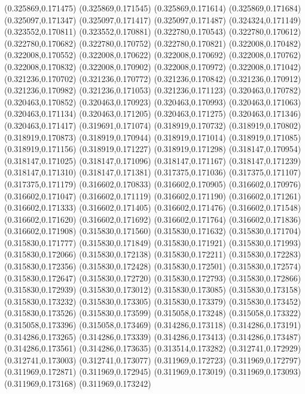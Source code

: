 (0.325869,0.171475)
(0.325869,0.171545)
(0.325869,0.171614)
(0.325869,0.171684)
(0.325097,0.171347)
(0.325097,0.171417)
(0.325097,0.171487)
(0.324324,0.171149)
(0.323552,0.170811)
(0.323552,0.170881)
(0.322780,0.170543)
(0.322780,0.170612)
(0.322780,0.170682)
(0.322780,0.170752)
(0.322780,0.170821)
(0.322008,0.170482)
(0.322008,0.170552)
(0.322008,0.170622)
(0.322008,0.170692)
(0.322008,0.170762)
(0.322008,0.170832)
(0.322008,0.170902)
(0.322008,0.170972)
(0.322008,0.171042)
(0.321236,0.170702)
(0.321236,0.170772)
(0.321236,0.170842)
(0.321236,0.170912)
(0.321236,0.170982)
(0.321236,0.171053)
(0.321236,0.171123)
(0.320463,0.170782)
(0.320463,0.170852)
(0.320463,0.170923)
(0.320463,0.170993)
(0.320463,0.171063)
(0.320463,0.171134)
(0.320463,0.171205)
(0.320463,0.171275)
(0.320463,0.171346)
(0.320463,0.171417)
(0.319691,0.171074)
(0.318919,0.170732)
(0.318919,0.170802)
(0.318919,0.170873)
(0.318919,0.170944)
(0.318919,0.171014)
(0.318919,0.171085)
(0.318919,0.171156)
(0.318919,0.171227)
(0.318919,0.171298)
(0.318147,0.170954)
(0.318147,0.171025)
(0.318147,0.171096)
(0.318147,0.171167)
(0.318147,0.171239)
(0.318147,0.171310)
(0.318147,0.171381)
(0.317375,0.171036)
(0.317375,0.171107)
(0.317375,0.171179)
(0.316602,0.170833)
(0.316602,0.170905)
(0.316602,0.170976)
(0.316602,0.171047)
(0.316602,0.171119)
(0.316602,0.171190)
(0.316602,0.171261)
(0.316602,0.171333)
(0.316602,0.171405)
(0.316602,0.171476)
(0.316602,0.171548)
(0.316602,0.171620)
(0.316602,0.171692)
(0.316602,0.171764)
(0.316602,0.171836)
(0.316602,0.171908)
(0.315830,0.171560)
(0.315830,0.171632)
(0.315830,0.171704)
(0.315830,0.171777)
(0.315830,0.171849)
(0.315830,0.171921)
(0.315830,0.171993)
(0.315830,0.172066)
(0.315830,0.172138)
(0.315830,0.172211)
(0.315830,0.172283)
(0.315830,0.172356)
(0.315830,0.172428)
(0.315830,0.172501)
(0.315830,0.172574)
(0.315830,0.172647)
(0.315830,0.172720)
(0.315830,0.172793)
(0.315830,0.172866)
(0.315830,0.172939)
(0.315830,0.173012)
(0.315830,0.173085)
(0.315830,0.173158)
(0.315830,0.173232)
(0.315830,0.173305)
(0.315830,0.173379)
(0.315830,0.173452)
(0.315830,0.173526)
(0.315830,0.173599)
(0.315058,0.173248)
(0.315058,0.173322)
(0.315058,0.173396)
(0.315058,0.173469)
(0.314286,0.173118)
(0.314286,0.173191)
(0.314286,0.173265)
(0.314286,0.173339)
(0.314286,0.173413)
(0.314286,0.173487)
(0.314286,0.173561)
(0.314286,0.173635)
(0.313514,0.173282)
(0.312741,0.172929)
(0.312741,0.173003)
(0.312741,0.173077)
(0.311969,0.172723)
(0.311969,0.172797)
(0.311969,0.172871)
(0.311969,0.172945)
(0.311969,0.173019)
(0.311969,0.173093)
(0.311969,0.173168)
(0.311969,0.173242)
